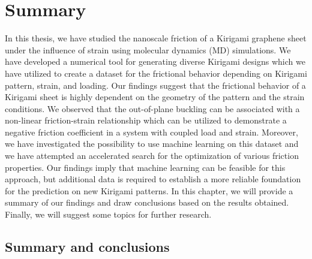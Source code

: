 \chapter{Summary}\label{chap:summary}
In this thesis, we have studied the nanoscale friction of a Kirigami graphene
sheet under the influence of strain using molecular dynamics (\acrshort{MD})
simulations. We have developed a numerical tool for generating diverse Kirigami
designs which we have utilized to create a dataset for the frictional behavior
depending on Kirigami pattern, strain, and loading. Our findings suggest that
the frictional behavior of a Kirigami sheet is highly dependent on the geometry
of the pattern and the strain conditions. We observed that the out-of-plane
buckling can be associated with a non-linear friction-strain relationship which
can be utilized to demonstrate a negative friction coefficient in a system with
coupled load and strain. Moreover, we have investigated the possibility to use
machine learning on this dataset and we have attempted an accelerated search for
the optimization of various friction properties. Our findings imply that machine
learning can be feasible for this approach, but additional data is required to
establish a more reliable foundation for the prediction on new Kirigami
patterns. In this chapter, we will provide a summary of our findings and draw
conclusions based on the results obtained. Finally, we will suggest some topics
for further research.


\section{Summary and conclusions}

